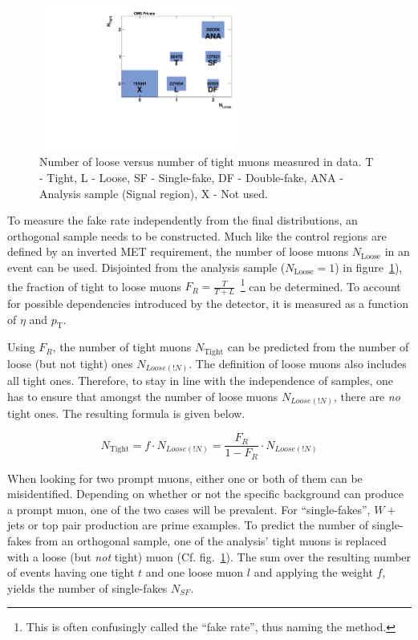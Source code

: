 \begin{figure}[ht!]
  \centering
    \includegraphics[width=0.6\textwidth]{plots/nloosetight.pdf}
  \caption{Number of loose versus number of tight muons measured in data. T - Tight, L - Loose, SF - Single-fake, DF - Double-fake, ANA - Analysis sample (Signal region), X - Not used.}
  \label{fig:nloosetight}
\end{figure}

To measure the fake rate independently from the final distributions, an orthogonal sample needs to be constructed. Much like the control regions are defined by an inverted MET requirement, the number of loose muons $N_{\text{Loose}}$ in an event can be used. Disjointed from the analysis sample ($N_{\text{Loose}} = 1$) in figure~\ref{fig:nloosetight}), the fraction of tight to loose muons $F_R = \frac{T}{T+L}$~\footnote{This is often confusingly called the ``fake rate'', thus naming the method.} can be determined. To account for possible dependencies introduced by the detector, it is measured as a function of $\eta$ and $p_{\text{T}}$. 

Using $F_R$, the number of tight muons $N_{\text{Tight}}$ can be predicted from the number of loose (but not tight) ones $N_{Loose(!N)}$. The definition of loose muons also includes all tight ones. Therefore, to stay in line with the independence of samples, one has to ensure that amongst the number of loose muons $N_{Loose(!N)}$, there are \textit{no} tight ones. The resulting formula is given below.

\begin{equation}
  \label{eq:fakerate}
  N_{\text{Tight}} = f \cdot N_{Loose(!N)} = \frac{F_R }{1 - F_R} \cdot N_{Loose(!N)}
\end{equation}

When looking for two prompt muons, either one or both of them can be misidentified. Depending on whether or not the specific background can produce a prompt muon, one of the two cases will be prevalent. For ``single-fakes'', $W +$ jets or top pair production are prime examples. To predict the number of single-fakes from an orthogonal sample, one of the analysis' tight muons is replaced with a loose (but \textit{not} tight) muon (Cf. fig.~\ref{fig:nloosetight}). The sum over the resulting number of events having one tight $t$ and one loose muon $l$ and applying the weight $f$, yields the number of single-fakes $N_{SF}$.

